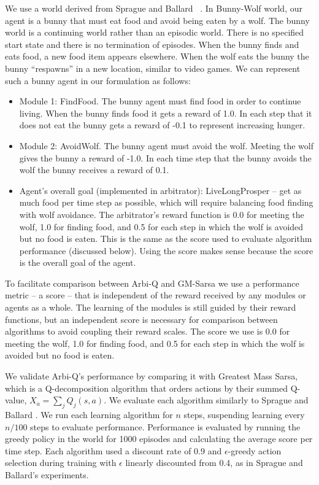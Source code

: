 We use a world derived from Sprague and Ballard ~\cite{sprague2003multiple-goal}.  In Bunny-Wolf world, our agent is a bunny that must eat food and avoid being eaten by a wolf.  The bunny world is a continuing world rather than an episodic world. There is no specified start state and there is no termination of episodes. When the bunny finds and eats food, a new food item appears elsewhere. When the wolf eats the bunny the bunny ``respawns'' in a new location, similar to video games. We can represent such a bunny agent in our formulation as follows:

\begin{itemize}

\item Module 1: FindFood.  The bunny agent must find food in order to continue living.  When the bunny finds food it gets a reward of 1.0. In each step that it does not eat the bunny gets a reward of -0.1 to represent increasing hunger.

\item Module 2: AvoidWolf.  The bunny agent must avoid the wolf. Meeting the wolf gives the bunny a reward of -1.0. In each time step that the bunny avoids the wolf the bunny receives a reward of 0.1.

\item Agent's overall goal (implemented in arbitrator): LiveLongProsper -- get as much food per time step as possible, which will require balancing food finding with wolf avoidance. The arbitrator's reward function is 0.0 for meeting the wolf, 1.0 for finding food, and 0.5 for each step in which the wolf is avoided but no food is eaten. This is the same as the score used to evaluate algorithm performance (discussed below). Using the score makes sense because the score is the overall goal of the agent.

\end{itemize}

To facilitate comparison between Arbi-Q and GM-Sarsa we use a performance metric -- a score -- that is independent of the reward received by any modules or agents as a whole. The learning of the modules is still guided by their reward functions, but an independent score is necessary for comparison between algorithms to avoid coupling their reward scales. The score we use is 0.0 for meeting the wolf, 1.0 for finding food, and 0.5 for each step in which the wolf is avoided but no food is eaten.

We validate Arbi-Q's performance by comparing it with Greatest Mass Sarsa, which is a Q-decomposition algorithm that orders actions by their summed Q-value, $X_a=\sum_j Q_j(s,a)$. We evaluate each algorithm similarly to Sprague and Ballard \cite{sprague2003multiple-goal}. We run each learning algorithm for $n$ steps, suspending learning every $n/100$ steps to evaluate performance. Performance is evaluated by running the greedy policy in the world for 1000 episodes and calculating the average score per time step.  Each algorithm used a discount rate of 0.9 and $\epsilon$-greedy action selection during training with $\epsilon$ linearly discounted from 0.4, as in Sprague and Ballard's experiments.

